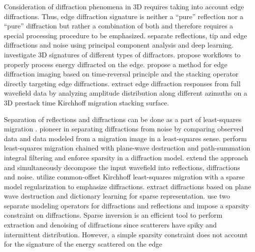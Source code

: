 Consideration of diffraction phenomena in 3D \cite[]{keller1962geometrical,klem2008edge,hoeber2010diffractions} requires taking into account edge diffractions.
Thus, edge diffraction signature is neither a ``pure'' reflection nor a ``pure'' diffraction but rather a combination of both and therefore requires a special processing procedure to be emphasized.
\cite{serfaty2017wavefield} separate reflections, tip and edge diffractions and noise using principal component analysis and deep learning.
\cite{klokov2011point} \old{;}\cite{bona2015using} investigate 3D signatures of different types of diffractors. 
\cite{alonaizi13}\old{;}\cite{merzlikin2017unconventional} propose workflows to properly process energy diffracted on the edge. 
\cite{keydar2019wave} propose a method for edge diffraction imaging based on time-reversal principle and the stacking operator 
directly targeting edge diffractions. \cite{dell2019azimuthal} extract edge diffraction responses from full wavefield data by analyzing amplitude distribution
along different azimuths on a 3D prestack time Kirchhoff migration stacking surface.

Separation of reflections and diffractions can be done as a part of least-squares migration \cite[]{Nemeth99,ronen2000least}. \cite{harlan84}
pioneer in separating diffractions from noise by comparing observed data and data modeled from a migration image in a least-squares sense.
\cite{merzlikin2016least} perform least-squares migration chained with plane-wave destruction and path-summation integral filtering and enforce sparsity
in a diffraction model.
\cite{merzlikin2019least} extend the approach and simultaneously decompose the input wavefield into reflections, diffractions and noise.
\cite{yu2016sparse} utilize common-offset Kirchhoff least-squares migration with a sparse model regularization to emphasize diffractions.
\cite{yu2017seismic} extract diffractions based on plane wave destruction and dictionary learning for sparse representation.
\cite{yu2016separation} use two separate modeling operators for diffractions and reflections and impose a sparsity constraint on diffractions.
Sparse inversion is an efficient tool to perform extraction and denoising of diffractions since scatterers have spiky and intermittent distribution. However, a simple sparsity
constraint does not account for the signature of the energy scattered on the edge

